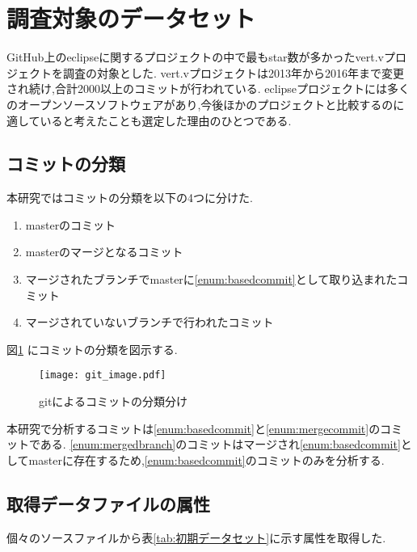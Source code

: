 \documentclass{fose2016}           %
\begin{document}
\section{調査対象のデータセット}\label{調査対象のデータセット}
GitHub上のeclipseに関するプロジェクトの中で最もstar数が多かったvert.vプロジェクトを調査の対象とした.
vert.vプロジェクトは2013年から2016年まで変更され続け,合計2000以上のコミットが行われている.
eclipseプロジェクトには多くのオープンソースソフトウェアがあり,今後ほかのプロジェクトと比較するのに適していると考えたことも選定した理由のひとつである.

\subsection{コミットの分類}
本研究ではコミットの分類を以下の4つに分けた.

\begin{enumerate}
\item masterのコミット \label{enum:basedcommit}
\item masterのマージとなるコミット \label{enum:mergecommit}
\item マージされたブランチでmasterに\ref{enum:basedcommit}として取り込まれたコミット \label{enum:mergedbranch}
\item マージされていないブランチで行われたコミット
\end{enumerate}

図\ref{fig:gitimage} にコミットの分類を図示する.

\begin{figure}[t]
\centering
\texttt{[image: git\_image.pdf]}
\caption{gitによるコミットの分類分け}
\label{fig:gitimage} 
\end{figure}

本研究で分析するコミットは\ref{enum:basedcommit}と\ref{enum:mergecommit}のコミットである.
\ref{enum:mergedbranch}のコミットはマージされ\ref{enum:basedcommit}としてmasterに存在するため,\ref{enum:basedcommit}のコミットのみを分析する.

\subsection{取得データファイルの属性}
個々のソースファイルから表\ref{tab:初期データセット}に示す属性を取得した.
\end{document}

